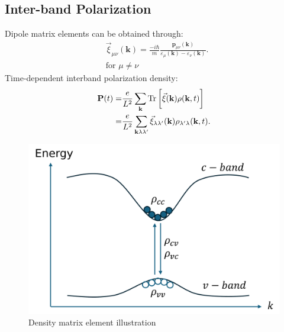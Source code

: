 \documentclass{beamer}
\begin{document}
\subsection{Inter-band Polarization}
\begin{frame}
		\begin{multicols}{2}
Dipole matrix elements can be obtained through:
\begin{align}
&\vec{\xi}_{\mu\nu}(\textbf{k}) = \frac{-i\hbar}{m}\frac{\textbf{p}_{\mu\nu}(\textbf{k})}{\varepsilon_{\mu}(\textbf{k}) - \varepsilon_{\nu}(\textbf{k})}.\\
&\text{for } \mu \neq \nu \nonumber
\end{align}
Time-dependent interband polarization density:
\begin{align}
\textbf{P}(t) = &\frac{e}{L^2} \sum_{\textbf{k}} \Tr\bigg[\vec{\xi}(\textbf{k})\rho(\textbf{k},t)\bigg]\nonumber\\
= &\frac{e}{L^2} \sum_{\textbf{k}\lambda\lambda'}\vec{\xi}_{\lambda\lambda'}(\textbf{k})\rho_{\lambda'\lambda}(\textbf{k},t).
\end{align}
\columnbreak
\begin{figure}
\includegraphics[width=1\linewidth]{images/cvbeamer.pdf}
\caption{Density matrix element illustration}
\end{figure}
	\end{multicols}
	\end{frame}
\end{document}
